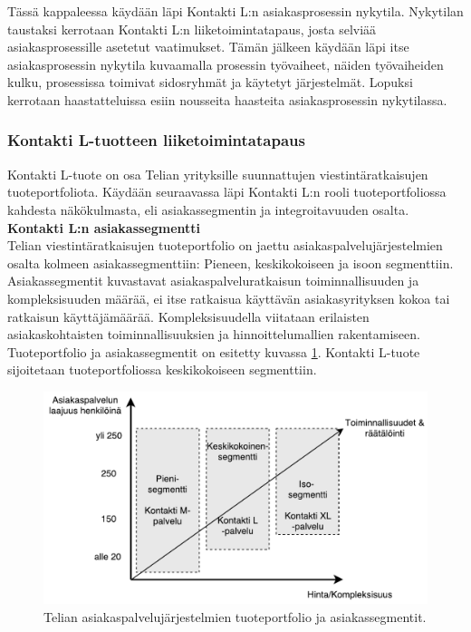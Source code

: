 \documentclass[finnish,12pt,a4paper,pdftex]{article}
\begin{document}
Tässä kappaleessa käydään läpi Kontakti L:n asiakasprosessin nykytila. Nykytilan taustaksi kerrotaan Kontakti L:n liiketoimintatapaus, josta selviää asiakasprosessille asetetut vaatimukset. Tämän jälkeen käydään läpi itse asiakasprosessin nykytila kuvaamalla prosessin työvaiheet, näiden työvaiheiden kulku, prosessissa toimivat sidosryhmät ja käytetyt järjestelmät. Lopuksi kerrotaan haastatteluissa esiin nousseita haasteita asiakasprosessin nykytilassa.

\subsubsection{Kontakti L-tuotteen liiketoimintatapaus}

Kontakti L-tuote on osa Telian yrityksille suunnattujen viestintäratkaisujen tuoteportfoliota. Käydään seuraavassa läpi Kontakti L:n rooli tuoteportfoliossa kahdesta näkökulmasta, eli asiakassegmentin ja integroitavuuden osalta.\\

\textbf{Kontakti L:n asiakassegmentti}\\

Telian viestintäratkaisujen tuoteportfolio on jaettu asiakaspalvelujärjestelmien osalta kolmeen asiakassegmenttiin: Pieneen, keskikokoiseen ja isoon segmenttiin. Asiakassegmentit kuvastavat asiakaspalveluratkaisun toiminnallisuuden ja kompleksisuuden määrää, ei itse ratkaisua käyttävän asiakasyrityksen kokoa tai ratkaisun käyttäjämäärää. Kompleksisuudella viitataan erilaisten asiakaskohtaisten toiminnallisuuksien ja hinnoittelumallien rakentamiseen. Tuoteportfolio ja asiakassegmentit on esitetty kuvassa \ref{fig:segmentit}. Kontakti L-tuote sijoitetaan tuoteportfoliossa keskikokoiseen segmenttiin.\\

\begin{figure}[!h]
    \centering
    \includegraphics[scale=0.5]{images/segmentit.pdf}
    \caption{Telian asiakaspalvelujärjestelmien tuoteportfolio ja asiakassegmentit.}
    \label{fig:segmentit}
\end{figure}
\end{document}
